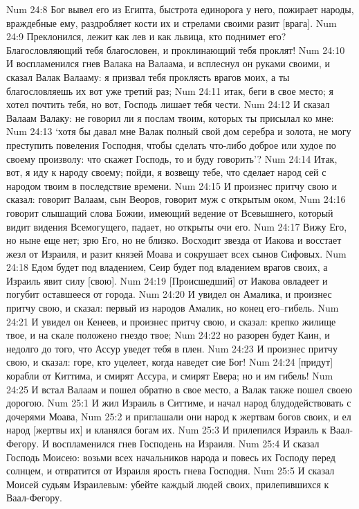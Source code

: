 Num 24:8  Бог вывел его из Египта, быстрота единорога у него, пожирает народы, враждебные ему, раздробляет кости их и стрелами своими разит [врага].
Num 24:9  Преклонился, лежит как лев и как львица, кто поднимет его? Благословляющий тебя благословен, и проклинающий тебя проклят!
Num 24:10  И воспламенился гнев Валака на Валаама, и всплеснул он руками своими, и сказал Валак Валааму: я призвал тебя проклясть врагов моих, а ты благословляешь их вот уже третий раз;
Num 24:11  итак, беги в свое место; я хотел почтить тебя, но вот, Господь лишает тебя чести.
Num 24:12  И сказал Валаам Валаку: не говорил ли я послам твоим, которых ты присылал ко мне:
Num 24:13  `хотя бы давал мне Валак полный свой дом серебра и золота, не могу преступить повеления Господня, чтобы сделать что-либо доброе или худое по своему произволу: что скажет Господь, то и буду говорить'?
Num 24:14  Итак, вот, я иду к народу своему; пойди, я возвещу тебе, что сделает народ сей с народом твоим в последствие времени.
Num 24:15  И произнес притчу свою и сказал: говорит Валаам, сын Веоров, говорит муж с открытым оком,
Num 24:16  говорит слышащий слова Божии, имеющий ведение от Всевышнего, который видит видения Всемогущего, падает, но открыты очи его.
Num 24:17  Вижу Его, но ныне еще нет; зрю Его, но не близко. Восходит звезда от Иакова и восстает жезл от Израиля, и разит князей Моава и сокрушает всех сынов Сифовых.
Num 24:18  Едом будет под владением, Сеир будет под владением врагов своих, а Израиль явит силу [свою].
Num 24:19  [Происшедший] от Иакова овладеет и погубит оставшееся от города.
Num 24:20  И увидел он Амалика, и произнес притчу свою, и сказал: первый из народов Амалик, но конец его--гибель.
Num 24:21  И увидел он Кенеев, и произнес притчу свою, и сказал: крепко жилище твое, и на скале положено гнездо твое;
Num 24:22  но разорен будет Каин, и недолго до того, что Ассур уведет тебя в плен.
Num 24:23  И произнес притчу свою, и сказал: горе, кто уцелеет, когда наведет сие Бог!
Num 24:24  [придут] корабли от Киттима, и смирят Ассура, и смирят Евера; но и им гибель!
Num 24:25  И встал Валаам и пошел обратно в свое место, а Валак также пошел своею дорогою.
Num 25:1  И жил Израиль в Ситтиме, и начал народ блудодействовать с дочерями Моава,
Num 25:2  и приглашали они народ к жертвам богов своих, и ел народ [жертвы их] и кланялся богам их.
Num 25:3  И прилепился Израиль к Ваал-Фегору. И воспламенился гнев Господень на Израиля.
Num 25:4  И сказал Господь Моисею: возьми всех начальников народа и повесь их Господу перед солнцем, и отвратится от Израиля ярость гнева Господня.
Num 25:5  И сказал Моисей судьям Израилевым: убейте каждый людей своих, прилепившихся к Ваал-Фегору.
